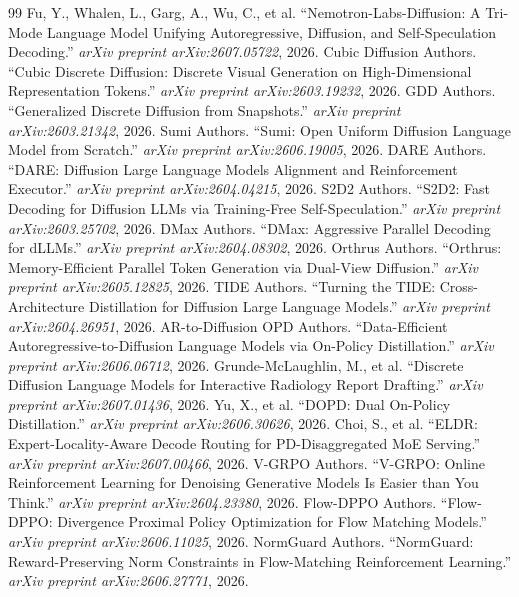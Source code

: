 \documentclass[11pt,a4paper]{article}
\begin{document}
\begin{thebibliography}{99}
 Fu, Y., Whalen, L., Garg, A., Wu, C., et al. ``Nemotron-Labs-Diffusion: A Tri-Mode Language Model Unifying Autoregressive, Diffusion, and Self-Speculation Decoding.'' \emph{arXiv preprint arXiv:2607.05722}, 2026.
 Cubic Diffusion Authors. ``Cubic Discrete Diffusion: Discrete Visual Generation on High-Dimensional Representation Tokens.'' \emph{arXiv preprint arXiv:2603.19232}, 2026.
 GDD Authors. ``Generalized Discrete Diffusion from Snapshots.'' \emph{arXiv preprint arXiv:2603.21342}, 2026.
 Sumi Authors. ``Sumi: Open Uniform Diffusion Language Model from Scratch.'' \emph{arXiv preprint arXiv:2606.19005}, 2026.
 DARE Authors. ``DARE: Diffusion Large Language Models Alignment and Reinforcement Executor.'' \emph{arXiv preprint arXiv:2604.04215}, 2026.
 S2D2 Authors. ``S2D2: Fast Decoding for Diffusion LLMs via Training-Free Self-Speculation.'' \emph{arXiv preprint arXiv:2603.25702}, 2026.
 DMax Authors. ``DMax: Aggressive Parallel Decoding for dLLMs.'' \emph{arXiv preprint arXiv:2604.08302}, 2026.
 Orthrus Authors. ``Orthrus: Memory-Efficient Parallel Token Generation via Dual-View Diffusion.'' \emph{arXiv preprint arXiv:2605.12825}, 2026.
 TIDE Authors. ``Turning the TIDE: Cross-Architecture Distillation for Diffusion Large Language Models.'' \emph{arXiv preprint arXiv:2604.26951}, 2026.
 AR-to-Diffusion OPD Authors. ``Data-Efficient Autoregressive-to-Diffusion Language Models via On-Policy Distillation.'' \emph{arXiv preprint arXiv:2606.06712}, 2026.
 Grunde-McLaughlin, M., et al. ``Discrete Diffusion Language Models for Interactive Radiology Report Drafting.'' \emph{arXiv preprint arXiv:2607.01436}, 2026.
 Yu, X., et al. ``DOPD: Dual On-Policy Distillation.'' \emph{arXiv preprint arXiv:2606.30626}, 2026.
 Choi, S., et al. ``ELDR: Expert-Locality-Aware Decode Routing for PD-Disaggregated MoE Serving.'' \emph{arXiv preprint arXiv:2607.00466}, 2026.
 V-GRPO Authors. ``V-GRPO: Online Reinforcement Learning for Denoising Generative Models Is Easier than You Think.'' \emph{arXiv preprint arXiv:2604.23380}, 2026.
 Flow-DPPO Authors. ``Flow-DPPO: Divergence Proximal Policy Optimization for Flow Matching Models.'' \emph{arXiv preprint arXiv:2606.11025}, 2026.
 NormGuard Authors. ``NormGuard: Reward-Preserving Norm Constraints in Flow-Matching Reinforcement Learning.'' \emph{arXiv preprint arXiv:2606.27771}, 2026.
\end{thebibliography}
\end{document}

